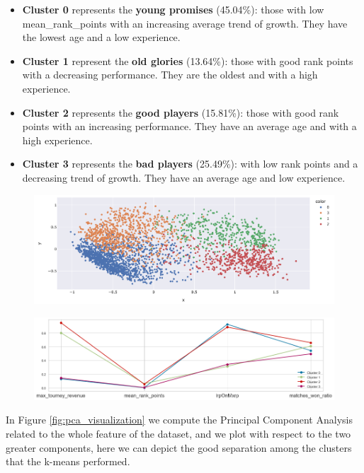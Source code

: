 \begin{itemize}
	\item{ \textbf{Cluster 0} represents the \textbf{young promises} (45.04\%): those with low mean\_rank\_points with an increasing average trend of growth. They have the lowest age and a low experience.}
	\item{ \textbf{Cluster 1} represent the \textbf{old glories} (13.64\%): those with good rank points with a decreasing performance. They are the oldest and with a high experience.}
	\item{ \textbf{Cluster 2} represents the \textbf{good players} (15.81\%): those with good rank points with an increasing performance. They have an average age and with a high experience.}
	\item{ \textbf{Cluster 3} represents the \textbf{bad players} (25.49\%): with low rank points and a decreasing trend of growth. They have an average age and low experience.}
\end{itemize}
\begin{figure}[h]
	\centering
	\begin{minipage}{.50\textwidth}
		\centering
		\includegraphics[width=\textwidth]{plots/kmeans/scatter_pca.png}
		\label{fig:pca_visualization}
	\end{minipage}%
	\begin{minipage}{.50\textwidth}
		\centering
		\includegraphics[width=\textwidth]{plots/kmeans/centers_plot.png}
		\label{fig:kmeans_centroid}
	\end{minipage}
\end{figure}
In Figure \ref{fig:pca_visualization} we compute the Principal Component Analysis related to the whole feature of the dataset, and we plot with respect to the two greater components, here we can depict the good separation among the clusters that the k-means performed.

